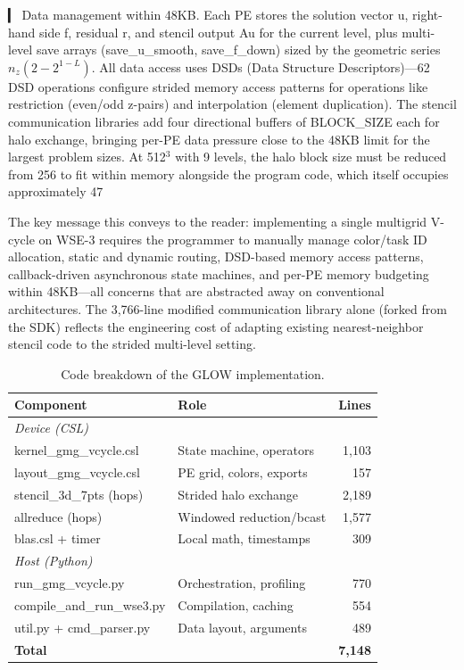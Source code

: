 \documentclass[sigconf]{acmart}
\begin{document}
{  ▎ Data management within 48KB. Each PE stores the solution vector u, right-hand side f, residual r, and stencil output Au for the current level, plus multi-level save arrays (save_u_smooth, save_f_down) sized by the
  geometric series $n_z(2 - 2^{1-L})$. All data access uses DSDs (Data Structure Descriptors)—62 DSD operations configure strided memory access patterns for operations like restriction (even/odd z-pairs) and interpolation
  (element duplication). The stencil communication libraries add four directional buffers of BLOCK_SIZE each for halo exchange, bringing per-PE data pressure close to the 48KB limit for the largest problem sizes. At 512$^3$
  with 9 levels, the halo block size must be reduced from 256 to fit within memory alongside the program code, which itself occupies approximately 47%

  
  The key message this conveys to the reader: implementing a single multigrid V-cycle on WSE-3 requires the programmer to manually manage color/task ID allocation, static and dynamic routing, DSD-based memory access
  patterns, callback-driven asynchronous state machines, and per-PE memory budgeting within 48KB—all concerns that are abstracted away on conventional architectures. The 3,766-line modified communication library alone
  (forked from the SDK) reflects the engineering cost of adapting existing nearest-neighbor stencil code to the strided multi-level setting.
  
    \begin{table}[t]
        \caption{Code breakdown of the GLOW implementation.}
        \label{tab:code_breakdown}
        \centering
        \small
        \begin{tabular}{llr}
        \toprule
        \textbf{Component} & \textbf{Role} & \textbf{Lines} \\
        \midrule
        \multicolumn{3}{l}{\textit{Device (CSL)}}\\[-4pt]
        \quad kernel\_gmg\_vcycle.csl & State machine, operators & 1,103 \\
        \quad layout\_gmg\_vcycle.csl & PE grid, colors, exports & 157 \\
        \quad stencil\_3d\_7pts (hops) & Strided halo exchange & 2,189 \\
        \quad allreduce (hops) & Windowed reduction/bcast & 1,577 \\
        \quad blas.csl + timer & Local math, timestamps & 309 \\
        \midrule
        \multicolumn{3}{l}{\textit{Host (Python)}}\\[-4pt]
        \quad run\_gmg\_vcycle.py & Orchestration, profiling & 770 \\
        \quad compile\_and\_run\_wse3.py & Compilation, caching & 554 \\
        \quad util.py + cmd\_parser.py & Data layout, arguments & 489 \\
        \midrule
        \textbf{Total} & & \textbf{7,148} \\
        \bottomrule
        \end{tabular}
        \end{table}
        
  }
      
\end{document}
